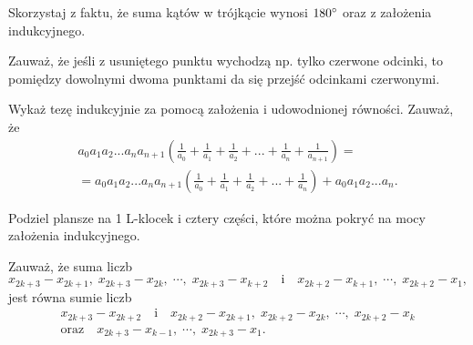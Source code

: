 \newpage
{}


\begin{hints_list}
	\item Skorzystaj z faktu, że suma kątów w trójkącie wynosi $180\degree$ oraz z założenia indukcyjnego.

	\item *

	\item *

	\item Zauważ, że jeśli z usuniętego punktu wychodzą np. tylko czerwone odcinki, to pomiędzy dowolnymi dwoma punktami da się przejść odcinkami czerwonymi.

	\item Wykaż tezę indukcyjnie za pomocą założenia i udowodnionej równości. Zauważ, że 
	\begin{align*}
		a_0a_1a_2...a_na_{n+1}\left(\frac{1}{a_0} + \frac{1}{a_1} + \frac{1}{a_2} + ... + \frac{1}{a_n} + \frac{1}{a_{n + 1}}\right) = \\ =   a_0a_1a_2...a_na_{n+1}\left(\frac{1}{a_0} + \frac{1}{a_1} + \frac{1}{a_2} + ... + \frac{1}{a_n}\right) + a_0a_1a_2...a_n.
	\end{align*}

	\item Podziel plansze na 1 L-klocek i cztery części, które można pokryć na mocy założenia indukcyjnego.

	\item Zauważ, że suma liczb
	\[
		{x_{2k+3}-x_{2k+1}, \; x_{2k+3}-x_{2k},\; \cdots, \; x_{2k+3}-x_{k+2}} \quad \text{i} \quad {x_{2k+2}-x_{k+1},\; \cdots, \; x_{2k+2}-x_1},
	\]
	jest równa sumie liczb
\begin{gather*}
	x_{2k+3} - x_{2k+2} \quad \text{i} \quad x_{2k+2} - x_{2k+1},\; x_{2k+2} - x_{2k},\; \cdots,\; x_{2k+2} - x_{k}  \\ \text{oraz} \quad {x_{2k+3} - x_{k-1},\; \cdots, \; x_{2k+3}-x_1}.
\end{gather*}
\end{hints_list}